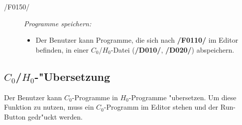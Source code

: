 \begin{description}
    \item[/F0150/]
      \textit{Programme speichern:}
      \begin{itemize}
        \item Der Benutzer kann Programme, die sich nach \textbf{/F0110/} im
        Editor befinden, in einer $C_0$/$H_0$-Datei
        (\textbf{/D010/}, \textbf{/D020/}) abspeichern.
      \end{itemize}
  \end{description}
\newpage
\subsection{$C_0$/$H_0$-"Ubersetzung}
  Der Benutzer kann $C_0$-Programme in $H_0$-Programme "ubersetzen. Um
  diese Funktion zu nutzen, muss ein $C_0$-Programm im Editor stehen und der
  Run-Button gedr"uckt werden.
